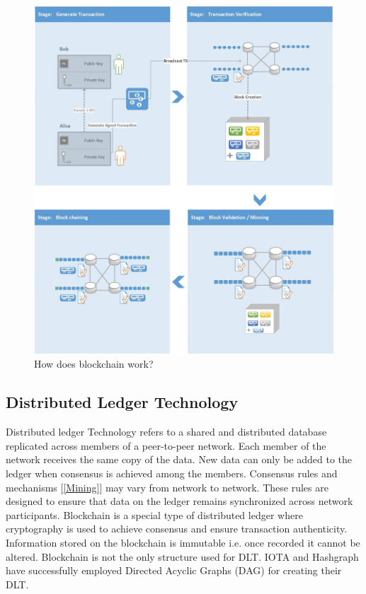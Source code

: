 \begin{figure}[t]
	\centering
    \includegraphics[width=160mm,scale=1]{figs/bc-workflow}
	\caption{How does blockchain work?}
	\label{fig:bc-workflow}
\end{figure}
\clearpage

\subsection{Distributed Ledger Technology} 
Distributed ledger Technology refers to a shared and distributed database replicated across members of a peer-to-peer network. Each member of the network receives the same copy of the data. New data can only be added to the ledger when consensus is achieved among the members. Consensus rules and mechanisms [\ref{Mining}] may vary from network to network. These rules are designed to ensure that data on the ledger remains synchronized across network participants. Blockchain is a special type of distributed ledger where cryptography is used to achieve consensus and ensure transaction authenticity.  Information stored on the blockchain is immutable i.e. once recorded it cannot be altered. Blockchain is not the only structure used for DLT. IOTA \cite{wiki:003} and Hashgraph have successfully employed Directed Acyclic Graphs (DAG) \cite{wiki:002} for creating their DLT. 
